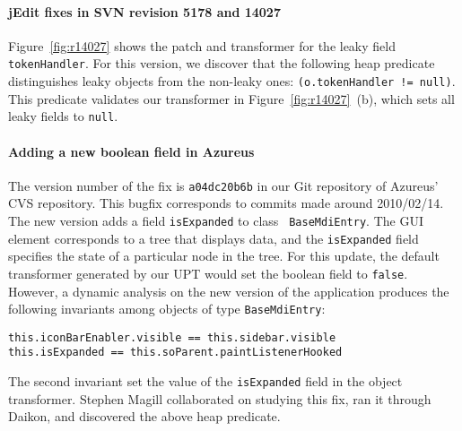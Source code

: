 \paragraph{jEdit fixes in SVN revision 5178 and 14027}
Figure~\ref{fig:r14027} shows the patch and transformer for the leaky field
{\tt tokenHandler}. For this version, we discover that the following heap
predicate distinguishes leaky objects from the non-leaky ones:
{\tt (o.tokenHandler != null)}.
This predicate validates our transformer in Figure~\ref{fig:r14027}~(b),
which sets all leaky fields to {\tt null}.

\paragraph{Adding a new boolean field in Azureus}
The version number of the fix is {\tt a04dc20b6b} in our Git repository of
Azureus' CVS repository. This bugfix corresponds to commits made around
2010/02/14. The new version adds a field {\tt isExpanded} to class {\tt
BaseMdiEntry}. The GUI element corresponds to a tree that displays data,
and the {\tt isExpanded} field specifies the state of a particular node in
the tree. For this update, the default transformer generated by our
\acf{UPT} would set the boolean field to {\tt false}. However,
a dynamic analysis on the new version of the application produces
the following invariants among objects of type {\tt BaseMdiEntry}:

\begin{center}
\begin{minipage}{0.8\textwidth}
\begin{lstlisting}[frame=single]
this.iconBarEnabler.visible == this.sidebar.visible
this.isExpanded == this.soParent.paintListenerHooked
\end{lstlisting}
\end{minipage}
\end{center}

The second invariant set the value of the {\tt isExpanded} field
in the object transformer. Stephen Magill collaborated on studying this
fix, ran it through Daikon, and discovered the
above heap predicate.

%
